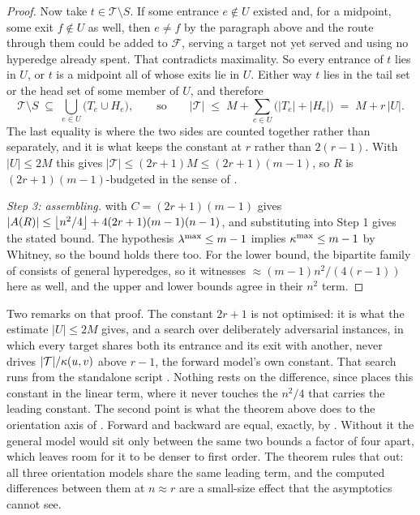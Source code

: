\begin{proof}
Now take $t \in \mathcal{T} \setminus S$. If some entrance $e \notin U$ existed
and, for a midpoint, some exit $f \notin U$ as well, then $e \ne f$ by the
paragraph above and the route through them could be added to $\mathcal{F}$,
serving a target not yet served and using no hyperedge already spent. That
contradicts maximality. So every entrance of $t$ lies in $U$, or $t$ is a midpoint
all of whose exits lie in $U$. Either way $t$ lies in the tail set or the head set
of some member of $U$, and therefore
\[
    \mathcal{T} \setminus S \;\subseteq\; \bigcup_{e \in U} \bigl(T_e \cup H_e\bigr) ,
    \qquad\text{so}\qquad
    |\mathcal{T}| \;\le\; M + \sum_{e \in U} \bigl(|T_e| + |H_e|\bigr)
    \;=\; M + r\,|U| .
\]
The last equality is where the two sides are counted together rather than
separately, and it is what keeps the constant at $r$ rather than $2(r-1)$. With
$|U| \le 2M$ this gives $|\mathcal{T}| \le (2r+1)M \le (2r+1)(m-1)$, so $R$ is
$(2r+1)(m-1)$-budgeted in the sense of .

\emph{Step 3: assembling.}  with $C = (2r+1)(m-1)$ gives
$|A(R)| \le \left\lfloor n^2/4 \right\rfloor + 4(2r+1)(m-1)(n-1)$, and substituting into Step 1 gives
the stated bound. The hypothesis $\lambda^{\max} \le m-1$ implies
$\kappa^{\max} \le m-1$ by Whitney, so the bound holds there too. For the lower
bound, the bipartite family of  consists of general
hyperedges, so it witnesses $\approx (m-1)n^2/(4(r-1))$ here as well, and the upper
and lower bounds agree in their $n^2$ term.
\end{proof}

Two remarks on that proof. The constant $2r+1$ is not
optimised: it is what the estimate
$|U| \le 2M$ gives, and a search over deliberately adversarial instances, in which
every target shares both its entrance and its exit with another, never drives
$|\mathcal{T}|/\kappa(u,v)$ above $r-1$, the forward model's own constant. That search runs from the standalone script
. Nothing
rests on the difference, since  places this constant
in the linear term, where it never touches the $n^2/4$ that carries the leading
constant. The second point is what the theorem above does to the
orientation axis of . Forward and backward are
equal, exactly, by . Without it the general
model would sit only between the same two bounds a factor of four apart, which
leaves room for it to be denser to first order. The theorem rules that out:
all three orientation models share the same leading
term, and the computed differences between them at $n \approx r$ are a
small-size effect that the asymptotics cannot see.


